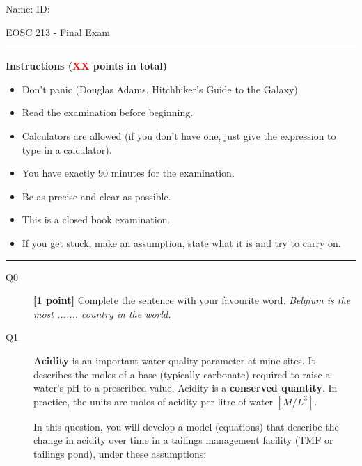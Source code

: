 \documentclass{article}
\begin{document}
\lstset{numbers=left, numberstyle=\small, stepnumber=1, numbersep=5pt,language=python}

\pagestyle{first}
\large{Name:} \hspace{11cm} \large{ID: }
\begin{center}
\Huge{EOSC 213 - Final Exam}
\end{center}

\rule{\textwidth}{1pt}

\large{\textbf{Instructions (\textcolor{red}{XX} points in total)}}
\begin{multicols}{2}
\begin{itemize}
\item Don't panic (Douglas Adams, Hitchhiker's Guide to the Galaxy)
\item Read the examination before beginning.
\item Calculators are allowed (if you don't have one, just give the expression to type in a calculator).
\item You have exactly 90 minutes for the examination.
\item Be as precise and clear as possible.
\item This is a closed book examination.
\item If you get stuck, make an assumption, state what it is and try to carry on.
\end{itemize} 
\end{multicols}



\rule{\textwidth}{1pt}

\begin{description}
\item [Q0]  \textbf{[1 point]} Complete the sentence with your favourite word. \textit{Belgium is the most ....... country in the world.} 
\vspace{0.25cm}

\end{description}


\begin{description}
\item[Q1] \textbf{Acidity} is an important water-quality parameter at mine sites. It describes the moles of a base (typically carbonate) required to raise a water's pH to a prescribed value. Acidity is a \textbf{conserved quantity}. In practice, the units are moles of acidity per litre of water $[M/L^3]$.   


In this question, you will develop a model (equations) that describe the change in acidity over time in a tailings management facility (TMF or tailings pond), under these assumptions:
\end{description}
\end{document}
